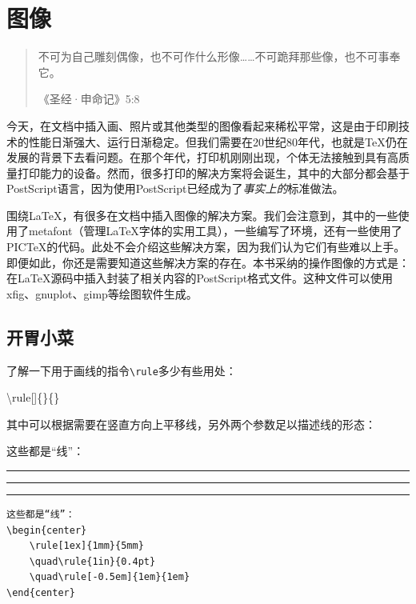 \chapter{图像}

\begin{quote}
    不可为自己雕刻偶像，也不可作什么形像……不可跪拜那些像，也不可事奉它。
    
    \hfill《圣经·申命记》5:8
\end{quote}

今天，在文档中插入画、照片或其他类型的图像看起来稀松平常，这是由于印刷技术的性能日渐强大、运行日渐稳定。但我们需要在20世纪80年代，也就是\TeX 仍在发展的背景下去看问题。在那个年代，打印机刚刚出现，个体无法接触到具有高质量打印能力的设备。然而，很多打印的解决方案将会诞生，其中的大部分都会基于PostScript语言，因为使用PostScript已经成为了\emph{事实上的}标准做法。

围绕\LaTeX ，有很多在文档中插入图像的解决方案。我们会注意到，其中的一些使用了\textsf{metafont}（管理\LaTeX 字体的实用工具），一些编写了环境，还有一些使用了PIC\TeX 的代码。此处不会介绍这些解决方案，因为我们认为它们有些难以上手。即便如此，你还是需要知道这些解决方案的存在。本书采纳的操作图像的方式是：在\LaTeX 源码中插入封装了相关内容的PostScript格式文件。这种文件可以使用\textsf{xfig}、\textsf{gnuplot}、\textsf{gimp}等绘图软件生成。

\section{开胃小菜}

了解一下用于画线的指令\verb|\rule|多少有些用处：

\begin{dmd}
\backslash rule[]\{\}\{\}
\end{dmd}

其中可以根据需要在竖直方向上平移线，另外两个参数足以描述线的形态：

\begin{codelist}[5.1]{
    这些都是“线”：
\begin{center}
    \rule[1ex]{1mm}{5mm}
    \quad\rule{1in}{0.4pt}
    \quad\rule[-0.5em]{1em}{1em}
\end{center}
}
\begin{verbatim}
这些都是“线”：
\begin{center}
    \rule[1ex]{1mm}{5mm}
    \quad\rule{1in}{0.4pt}
    \quad\rule[-0.5em]{1em}{1em}
\end{center}\end{verbatim}
\end{codelist}

